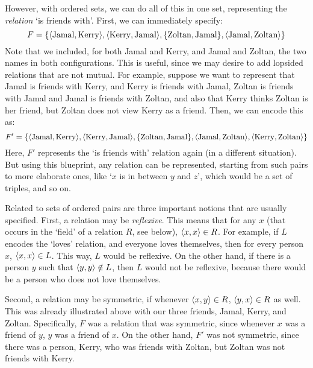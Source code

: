 However, with ordered sets, we can do all of this in one set, representing the \textit{relation} `is friends with'. First, we can immediately specify: 
%
\[F=\{\langle\text{Jamal}, \text{Kerry}\rangle, \langle\text{Kerry}, \text{Jamal}\rangle, \{\text{Zoltan}, \text{Jamal}\}, \langle\text{Jamal}, \text{Zoltan}\rangle\}\]
%
Note that we included, for both Jamal and Kerry, and Jamal and Zoltan, the two names in both configurations. This is useful, since we may desire to add lopsided relations that are not mutual. For example, suppose we want to represent that Jamal is friends with Kerry, and Kerry is friends with Jamal, Zoltan is friends with Jamal and Jamal is friends with Zoltan, and also that Kerry thinks Zoltan is her friend, but Zoltan does not view Kerry as a friend. Then, we can encode this as: 
%
\[F'=\{\langle\text{Jamal}, \text{Kerry}\rangle, \langle\text{Kerry}, \text{Jamal}\rangle, \{\text{Zoltan}, \text{Jamal}\}, \langle\text{Jamal}, \text{Zoltan}\rangle, \langle\text{Kerry}, \text{Zoltan}\rangle\}\]
%
Here, $F'$ represents the `is friends with' relation again (in a different situation). But using this blueprint, any relation can be represented, starting from such pairs to more elaborate ones, like `$x$ is in between $y$ and $z$', which would be a set of triples, and so on. 

Related to sets of ordered pairs are three important notions that are usually specified. First, a relation may be \textit{reflexive}. This means that for any $x$ (that occurs in the `field' of a relation $R$, see below), $\langle x, x\rangle \in R$. For example, if $L$ encodes the `loves' relation, and everyone loves themselves, then for every person $x$, $\langle x, x\rangle \in L$. This way, $L$ would be reflexive. On the other hand, if there is a person $y$ such that $\langle y, y\rangle \notin L$, then $L$ would not be reflexive, because there would be a person who does not love themselves. 

Second, a relation may be symmetric, if whenever $\langle x, y\rangle \in R$, $\langle y, x\rangle \in R$ as well. This was already illustrated above with our three friends, Jamal, Kerry, and Zoltan. Specifically, $F$ was a relation that was symmetric, since whenever $x$ was a friend of $y$, $y$ was a friend of $x$. On the other hand, $F'$ was not symmetric, since there was a person, Kerry, who was friends with Zoltan, but Zoltan was not friends with Kerry. 

